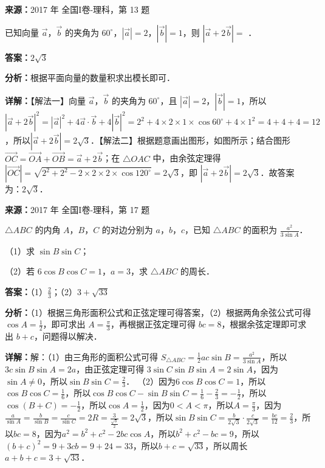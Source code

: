 \begin{question}[points=5]
\textbf{来源：}2017 年 全国I卷-理科，第 13 题\par
已知向量 $\vec{a}$，$\vec{b}$ 的夹角为 $60^\circ$，$|\vec{a}|=2$，$|\vec{b}|=1$，则 $|\vec{a}+2\vec{b}|=$ ．
\fillin[{$2\sqrt{3}$}]
\begin{solution}
\textbf{答案：}$2\sqrt{3}$

\textbf{分析：}根据平面向量的数量积求出模长即可．

\textbf{详解：}【解法一】向量 $\vec{a}$，$\vec{b}$ 的夹角为 $60^\circ$，且 $|\vec{a}|=2$，$|\vec{b}|=1$，所以$|\vec{a}+2\vec{b}|^2=|\vec{a}|^2+4\vec{a}\cdot\vec{b}+4|\vec{b}|^2=2^2+4\times2\times1\times\cos60^\circ+4\times1^2=4+4+4=12$，所以$|\vec{a}+2\vec{b}|=2\sqrt{3}$．【解法二】根据题意画出图形，如图所示；结合图形 $\overrightarrow{OC}=\overrightarrow{OA}+\overrightarrow{OB}=\vec{a}+2\vec{b}$；在 $\triangle OAC$ 中，由余弦定理得 $|\overrightarrow{OC}|=\sqrt{2^2+2^2-2\times2\times2\times\cos120^\circ}=2\sqrt{3}$，即 $|\vec{a}+2\vec{b}|=2\sqrt{3}$．故答案为：$2\sqrt{3}$．
\end{solution}
\end{question}

\begin{question}[points=12]
\textbf{来源：}2017 年 全国I卷-理科，第 17 题\par
$\triangle ABC$ 的内角 $A$，$B$，$C$ 的对边分别为 $a$，$b$，$c$，已知 $\triangle ABC$ 的面积为 $\frac{a^2}{3\sin A}$．

（1）求 $\sin B\sin C$；

（2）若 $6\cos B\cos C=1$，$a=3$，求 $\triangle ABC$ 的周长．
\begin{solution}
\textbf{答案：}（1）$\frac{2}{3}$；（2）$3+\sqrt{33}$

\textbf{分析：}（1）根据三角形面积公式和正弦定理可得答案，（2）根据两角余弦公式可得 $\cos A=\frac{1}{2}$，即可求出 $A=\frac{\pi}{3}$，再根据正弦定理可得 $bc=8$，根据余弦定理即可求出 $b+c$，问题得以解决．

\textbf{详解：}解：（1）由三角形的面积公式可得 $S_{\triangle ABC}=\frac{1}{2}ac\sin B=\frac{a^2}{3\sin A}$，所以$3c\sin B\sin A=2a$，由正弦定理可得 $3\sin C\sin B\sin A=2\sin A$，因为$\sin A\neq0$，所以$\sin B\sin C=\frac{2}{3}$．
（2）因为$6\cos B\cos C=1$，所以$\cos B\cos C=\frac{1}{6}$，所以$\cos B\cos C-\sin B\sin C=\frac{1}{6}-\frac{2}{3}=-\frac{1}{2}$，所以$\cos(B+C)=-\frac{1}{2}$，所以$\cos A=\frac{1}{2}$，因为$0<A<\pi$，所以$A=\frac{\pi}{3}$，因为$\frac{a}{\sin A}=\frac{b}{\sin B}=\frac{c}{\sin C}=2R=\frac{3}{\frac{\sqrt{3}}{2}}=2\sqrt{3}$，所以$\sin B\sin C=\frac{b}{2\sqrt{3}}\cdot\frac{c}{2\sqrt{3}}=\frac{bc}{12}=\frac{2}{3}$，所以$bc=8$，因为$a^2=b^2+c^2-2bc\cos A$，所以$b^2+c^2-bc=9$，所以$(b+c)^2=9+3cb=9+24=33$，所以$b+c=\sqrt{33}$，所以周长 $a+b+c=3+\sqrt{33}$．
\end{solution}
\end{question}

